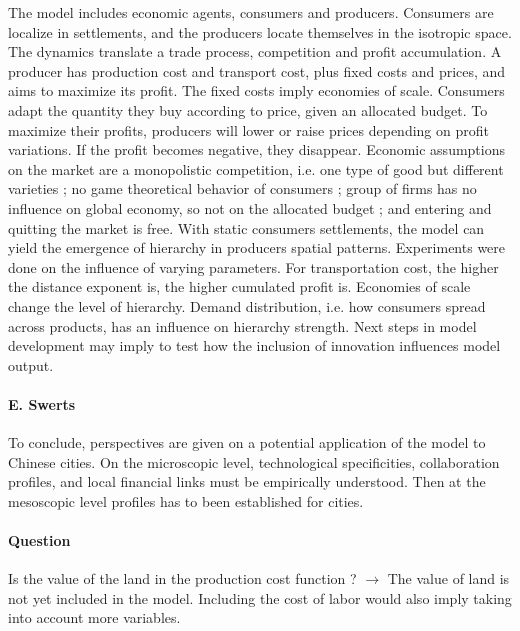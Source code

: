 \documentclass[10pt]{article}
\begin{document}
The model includes economic agents, consumers and producers. Consumers are localize in settlements, and the producers locate themselves in the isotropic space. The dynamics translate a trade process, competition and profit accumulation. A producer has production cost and transport cost, plus fixed costs and prices, and aims to maximize its profit. The fixed costs imply economies of scale. Consumers adapt the quantity they buy according to price, given an allocated budget. To maximize their profits, producers will lower or raise prices depending on profit variations. If the profit becomes negative, they disappear. Economic assumptions on the market are a monopolistic competition, i.e. one type of good but different varieties ; no game theoretical behavior of consumers ; group of firms has no influence on global economy, so not on the allocated budget ; and entering and quitting the market is free. With static consumers settlements, the model can yield the emergence of hierarchy in producers spatial patterns. Experiments were done on the influence of varying parameters. For transportation cost, the higher the distance exponent is, the higher cumulated profit is. Economies of scale change the level of hierarchy. Demand distribution, i.e. how consumers spread across products, has an influence on hierarchy strength. Next steps in model development may imply to test how the inclusion of innovation influences model output.


\paragraph{E. Swerts}

To conclude, perspectives are given on a potential application of the model to Chinese cities. On the microscopic level, technological specificities, collaboration profiles, and local financial links must be empirically understood. Then at the mesoscopic level profiles has to been established for cities.



\paragraph{Question}

Is the value of the land in the production cost function ? $\rightarrow$ The value of land is not yet included in the model. Including the cost of labor would also imply taking into account more variables.
\end{document}
